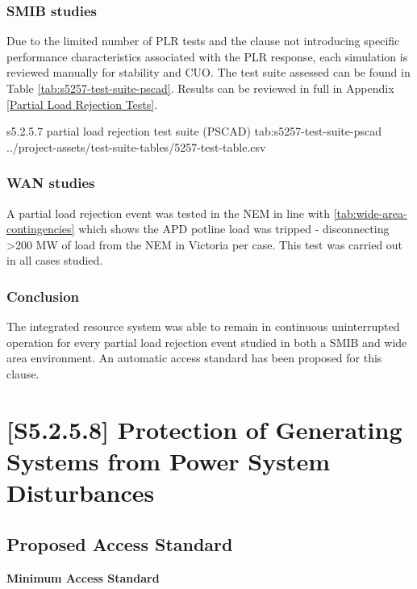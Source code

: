 \documentclass{../grid-link-report}
\newcommand{\projectassetsdir}{../project-assets}
\begin{document}
	\subsubsection{SMIB studies}
	
	Due to the limited number of \ac{PLR} tests and the clause not introducing specific performance characteristics associated with the \ac{PLR} response, each simulation is reviewed manually for stability and \ac{CUO}. The test suite assessed can be found in Table \ref{tab:s5257-test-suite-pscad}. Results can be reviewed in full in Appendix \ref{Partial Load Rejection Tests}.
	
	{
		\fontsize{9}{11}\selectfont
		\autoscaledlongtable
		{s5.2.5.7 partial load rejection test suite (PSCAD)}
		{tab:s5257-test-suite-pscad}
		{\projectassetsdir/test-suite-tables/5257-test-table.csv}
	}
	
	\subsubsection{WAN studies}
	
	A partial load rejection event was tested in the NEM in line with \ref{tab:wide-area-contingencies} which shows the APD potline load was tripped - disconnecting >200 MW of load from the NEM in Victoria per case. This test was carried out in all cases studied.
	
	\subsubsection{Conclusion}
	
	The integrated resource system was able to remain in continuous uninterrupted operation for every partial load rejection event studied in both a SMIB and wide area environment. An automatic access standard has been proposed for this clause.
	
	
	\section{[S5.2.5.8] Protection of Generating Systems from Power System Disturbances}
	\subsection{Proposed Access Standard}
	\textbf{Minimum Access Standard}
		\begin{tcolorbox}[lightgreenbox]
			
		\end{tcolorbox}
\end{document}
